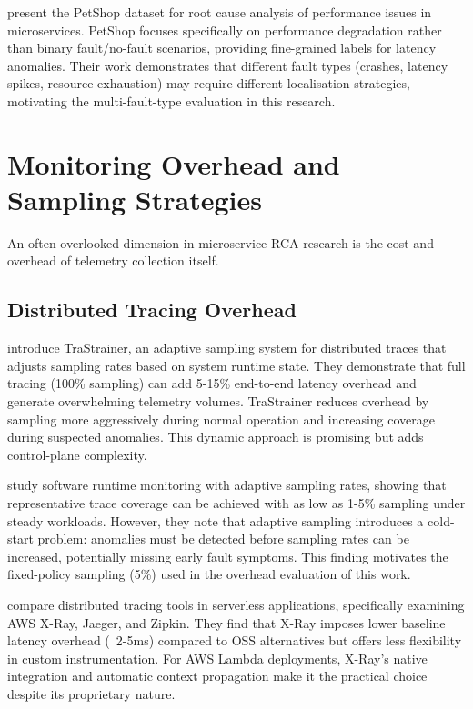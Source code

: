 \citet{hardt2024petshop} present the PetShop dataset for root cause analysis of performance issues in microservices. PetShop focuses specifically on performance degradation rather than binary fault/no-fault scenarios, providing fine-grained labels for latency anomalies. Their work demonstrates that different fault types (crashes, latency spikes, resource exhaustion) may require different localisation strategies, motivating the multi-fault-type evaluation in this research.

\section{Monitoring Overhead and Sampling Strategies}

An often-overlooked dimension in microservice RCA research is the cost and overhead of telemetry collection itself.

\subsection{Distributed Tracing Overhead}

\citet{huang2024trastrainer} introduce TraStrainer, an adaptive sampling system for distributed traces that adjusts sampling rates based on system runtime state. They demonstrate that full tracing (100\% sampling) can add 5-15\% end-to-end latency overhead and generate overwhelming telemetry volumes. TraStrainer reduces overhead by sampling more aggressively during normal operation and increasing coverage during suspected anomalies. This dynamic approach is promising but adds control-plane complexity.

\citet{mertz2023software} study software runtime monitoring with adaptive sampling rates, showing that representative trace coverage can be achieved with as low as 1-5\% sampling under steady workloads. However, they note that adaptive sampling introduces a cold-start problem: anomalies must be detected before sampling rates can be increased, potentially missing early fault symptoms. This finding motivates the fixed-policy sampling (5\%) used in the overhead evaluation of this work.

\citet{eder2023comparison} compare distributed tracing tools in serverless applications, specifically examining AWS X-Ray, Jaeger, and Zipkin. They find that X-Ray imposes lower baseline latency overhead (~2-5ms) compared to OSS alternatives but offers less flexibility in custom instrumentation. For AWS Lambda deployments, X-Ray's native integration and automatic context propagation make it the practical choice despite its proprietary nature.

